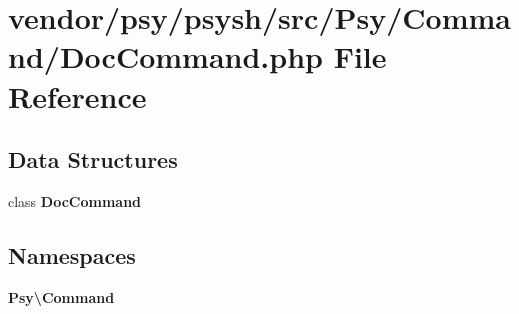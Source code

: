 \section{vendor/psy/psysh/src/\+Psy/\+Command/\+Doc\+Command.php File Reference}
\label{_doc_command_8php}
\subsection*{Data Structures}
\begin{DoxyCompactItemize}
\item 
class {\bf Doc\+Command}
\end{DoxyCompactItemize}
\subsection*{Namespaces}
\begin{DoxyCompactItemize}
\item 
 {\bf Psy\textbackslash{}\+Command}
\end{DoxyCompactItemize}
